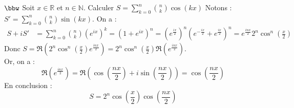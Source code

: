 \documentclass[11pt]{article}
\begin{document}
\begin{exercice}{$\bbw$}{}
    Soit $x\in\mathbb{R}$ et $n\in\mathbb{N}$. Calculer $S=\sum\limits_{k=0}^{n}{\binom{n}{k}\cos(kx)}$
    \tcblower
    Notons : $S'=\sum\limits_{k=0}^{n}{\binom{n}{k}\sin(kx)}$. On a :
    \begin{align*}
        S + iS' &= \sum_{k=0}^{n}{\binom{n}{k}\left(e^{ix}\right)^k} = (1 + e^{ix})^n = \left( e^{\frac{ix}{2}} \right)^n\left( e^{-\frac{ix}{2}} + e^{\frac{ix}{2}}\right)^n = e^{\frac{inx}{2}}2^n\cos^n\left(\frac{x}{2}\right)
    \end{align*}
    Donc $S = \Re\left( 2^n\cos^n\left( \frac{x}{2} \right)e^{\frac{inx}{2}} \right) = 2^n\cos^n\left( \frac{x}{2} \right)\Re\left( e^{\frac{inx}{2}} \right)$.\\
    Or, on a :
    \begin{equation*}
        \Re\left( e^{\frac{inx}{2}} \right) = \Re\left( \cos\left(\frac{nx}{2}\right) + i\sin\left(\frac{nx}{2}\right) \right) = \cos\left( \frac{nx}{2} \right)
    \end{equation*}
    En conclusion :
    \begin{equation*}
        S = 2^n \cos\left( \frac{x}{2} \right)\cos\left(\frac{nx}{2}\right)
    \end{equation*}
\end{exercice}
\end{document}
